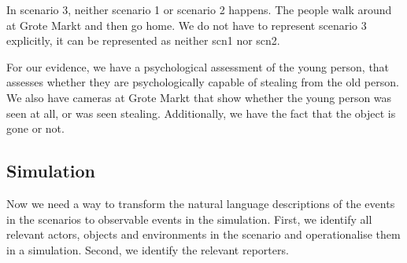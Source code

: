 \documentclass[12pt]{article}
\begin{document}
In scenario 3, neither scenario 1 or scenario 2 happens. The people walk around at Grote Markt and then go home. We do not have to represent scenario 3 explicitly, it can be represented as neither scn1 nor scn2.

For our evidence, we have a psychological assessment of the young person, that assesses whether they are psychologically capable of stealing from the old person. We also have cameras at Grote Markt that show whether the young person was seen at all, or was seen stealing. Additionally, we have the fact that the object is gone or not.





\subsection{Simulation}		%

Now we need a way to transform the natural language descriptions of the events in the scenarios to observable events in the simulation. First, we identify all relevant actors, objects and environments in the scenario and operationalise them in a simulation. Second, we identify the relevant reporters. 
\end{document}
